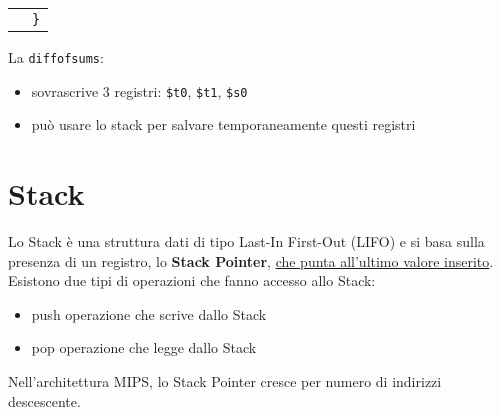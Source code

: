 \documentclass[../main.tex]{subfiles}
\begin{document}
\begin{table}[h!]
\begin{tabular}{ l l }
        & \texttt{\}} \\
    \end{tabular}
\end{table}

\noindent
La \texttt{diffofsums}:
\begin{itemize}
    \item sovrascrive 3 registri: \texttt{\$t0}, \texttt{\$t1}, \texttt{\$s0}
    \item può usare lo stack per salvare
    temporaneamente questi registri
\end{itemize}

\newpage

\section{Stack}
Lo Stack è una struttura dati di tipo Last-In First-Out (LIFO) e
si basa sulla presenza di un registro, lo \textbf{Stack Pointer},
\underline{che punta all'ultimo valore inserito}. \\[2mm]
Esistono due tipi di operazioni che fanno accesso allo Stack:
\begin{itemize}
    \item push operazione che scrive dallo Stack
    \item pop operazione che legge dallo Stack
\end{itemize}

\vspace{2mm}

\noindent
Nell'architettura MIPS, lo Stack Pointer cresce per numero di indirizzi
descescente.
\end{document}
